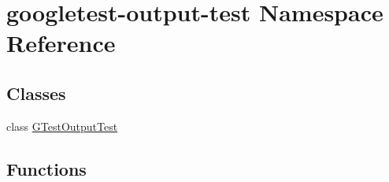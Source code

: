 \hypertarget{namespacegoogletest-output-test}{}\section{googletest-\/output-\/test Namespace Reference}
\label{namespacegoogletest-output-test}
\subsection*{Classes}
\begin{DoxyCompactItemize}
\item 
class \mbox{\hyperlink{classgoogletest-output-test_1_1GTestOutputTest}{G\+Test\+Output\+Test}}
\end{DoxyCompactItemize}
\subsection*{Functions}
